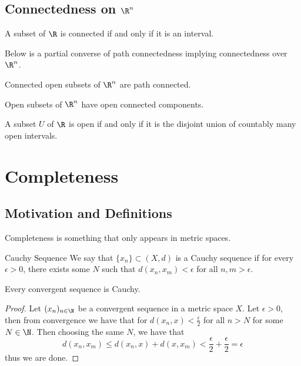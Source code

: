 \subsection{Connectedness on $\R^n$}
\begin{thm}{}{} A subset of $\R$ is connected if and only if it is an interval. 
\end{thm}

Below is a partial converse of path connectedness implying connectedness over $\R^n$. 

\begin{thm}{}{} Connected open subsets of $\R^n$ are path connected. 
\end{thm}

\begin{thm}{}{} Open subsets of $\R^n$ have open connected components. 
\end{thm}

\begin{thm}{}{} A subset $U$ of $\R$ is open if and only if it is the disjoint union of countably many open intervals. 
\end{thm}

\pagebreak
\section{Completeness}
\subsection{Motivation and Definitions}
Completeness is something that only appears in metric spaces. 
\begin{defn}{Cauchy Sequence}{} We say that $\{x_n\}\subset(X,d)$ is a Cauchy sequence if for every $\epsilon>0$, there exists some $N$ such that $d(x_n,x_m)<\epsilon$ for all $n,m>\epsilon$. 
\end{defn}

\begin{prp}{}{} Every convergent sequence is Cauchy. \tcbline
\begin{proof}
Let $(x_n)_{n\in\N}$ be a convergent sequence in a metric space $X$. Let $\epsilon>0$, then from convergence we have that for $d(x_n,x)<\frac{\epsilon}{2}$ for all $n>N$ for some $N\in\N$. Then choosing the same $N$, we have that $$d(x_n,x_m)\leq d(x_n,x)+d(x,x_m)<\frac{\epsilon}{2}+\frac{\epsilon}{2}=\epsilon$$ thus we are done. 
\end{proof}
\end{prp}

